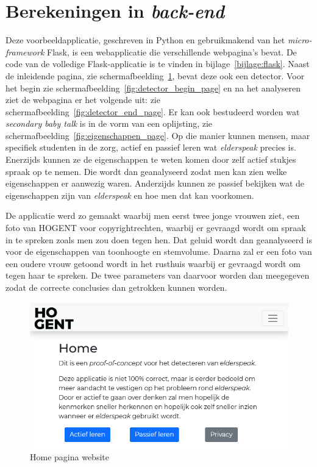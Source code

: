 \section{Berekeningen in \textit{back-end}}
Deze voorbeeldapplicatie, geschreven in Python en gebruikmakend van het \textit{micro-framework} Flask, is een webapplicatie die verschillende webpagina’s bevat. De code van de volledige Flask-applicatie is te vinden in bijlage~\ref{bijlage:flask}. Naast de inleidende pagina, zie schermafbeelding~\ref{fig:home_page}, bevat deze ook een detector. Voor het begin zie schermafbeelding~\ref{fig:detector_begin_page} en na het analyseren ziet de webpagina er het volgende uit: zie schermafbeelding~\ref{fig:detector_end_page}. Er kan ook bestudeerd worden wat \textit{secondary baby talk} is in de vorm van een oplijsting, zie schermafbeelding~\ref{fig:eigenschappen_page}. Op die manier kunnen mensen, maar specifiek studenten in de zorg, actief en passief leren wat \textit{elderspeak} precies is. Enerzijds kunnen ze de eigenschappen te weten komen door zelf actief stukjes spraak op te nemen. Die wordt dan geanalyseerd zodat men kan zien welke eigenschappen er aanwezig waren. Anderzijds kunnen ze passief bekijken wat de eigenschappen zijn van \textit{elderspeak} en hoe men dat kan voorkomen.

De applicatie werd zo gemaakt waarbij men eerst twee jonge vrouwen ziet, een foto van HOGENT voor copyrightrechten, waarbij er gevraagd wordt om spraak in te spreken zoals men zou doen tegen hen. Dat geluid wordt dan geanalyseerd is voor de eigenschappen van toonhoogte en stemvolume. Daarna zal er een foto van een oudere vrouw getoond wordt in het rusthuis waarbij er gevraagd wordt om tegen haar te spreken. De twee parameters van daarvoor worden dan meegegeven zodat de correcte conclusies dan getrokken kunnen worden.

\begin{figure}
    \centering
    \includegraphics[width=1\textwidth]{./img/home_website}
    \caption{\label{fig:home_page} Home pagina website}
\end{figure}


